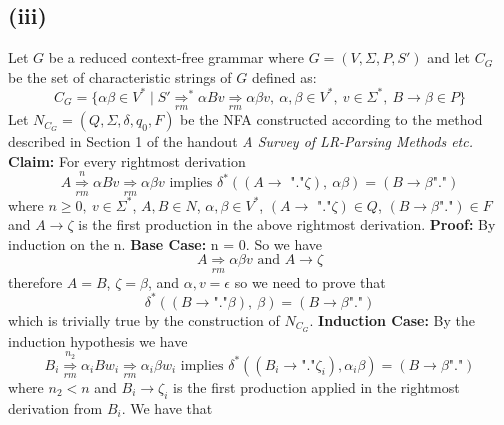 \documentclass[12pt]{article}
\begin{document}
\subsection*{(iii)} Let $G$ be a reduced context-free grammar where
$G = (V,\Sigma,P,S')$ and let $C_G$ be the set of characteristic strings of $G$
defined as:
$$C_G = \{\alpha\beta \in V^* \mid S' \underset{rm}{\Longrightarrow}^* \alpha Bv
\underset{rm}{\Longrightarrow} \alpha\beta v,\ \alpha,\beta \in V^*,\ v\in
\Sigma^*,\ B \rightarrow \beta \in P \}$$
Let $N_{C_G} = (Q,\Sigma,\delta,q_0,F)$ be the NFA constructed according to the
method described in Section 1 of the handout
\textit{A Survey of LR-Parsing Methods etc.}
\medskip\newline
\textbf{Claim:} For every rightmost derivation
$$A \overset{n}{\underset{rm}{\Longrightarrow}} \alpha Bv
\underset{rm}{\Longrightarrow}
\alpha\beta v \text{ implies } \delta^*((A \rightarrow \text{ "."}\zeta)
,\ \alpha\beta) = (B \rightarrow \beta\text{"."})$$
where $n\ge 0,\ v \in \Sigma^*$, $A,B\in N$, $\alpha,\beta\in V^*$,
$(A \rightarrow \text{ "."}\zeta)\in Q$, $(B \rightarrow \beta\text{"."})\in F$
and $A \rightarrow \zeta$ is the first production in the above rightmost
derivation.
\medskip\newline
\textbf{Proof:} By induction on the n.
\medskip\newline
\textbf{Base Case:} n = 0. So we have
$$A \underset{rm}{\Longrightarrow} \alpha\beta v \text{ and } A \rightarrow \zeta$$
therefore $A = B$, $\zeta = \beta$, and $\alpha, v = \epsilon$
so we need to prove that
$$\delta^*((B \rightarrow \text{"."}\beta),\ \beta) =
(B \rightarrow \beta\text{"."})$$
which is trivially true by the construction of $N_{C_G}$.
\medskip\newline
\textbf{Induction Case:} By the induction hypothesis we have
$$B_i \overset{n_2}{\underset{rm}{\Longrightarrow}} \alpha_i Bw_i
\underset{rm}{\Longrightarrow} \alpha_i \beta w_i \text{ implies }
\delta^*((B_i \rightarrow\text{"."}\zeta_i), \alpha_i \beta) =
(B \rightarrow \beta\text{"."})$$
where $n_2 < n$ and $B_i \rightarrow \zeta_i$ is the first production applied
in the rightmost derivation from $B_i$. We have that
\end{document}
